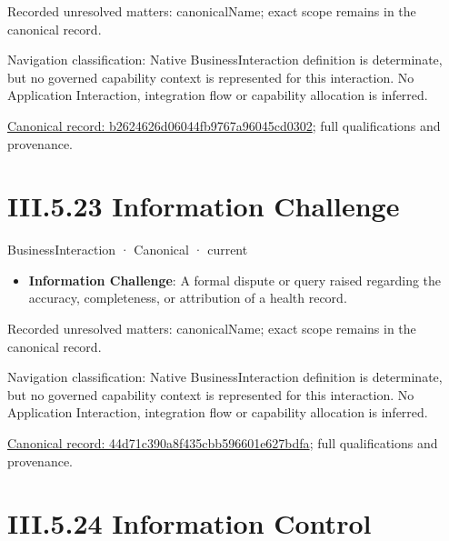 {\small Recorded unresolved matters: canonicalName; exact scope remains in the canonical record.}\par
{\small Navigation classification: Native BusinessInteraction definition is determinate, but no governed capability context is represented for this interaction. No Application Interaction, integration flow or capability allocation is inferred.}\par
{\footnotesize \href{../../../../../../../continuum/business/business-interaction/b2624626d06044fb9767a96045cd0302.md}{Canonical record: b2624626d06044fb9767a96045cd0302}; full qualifications and provenance.}\par
\section*{III.5.23 Information Challenge}
\label{navigation:III.5.23}

\label{element:44d71c390a8f435cbb596601e627bdfa}
{\small BusinessInteraction · Canonical · current}\par

\begin{itemize}


\item \textbf{Information Challenge}: A formal dispute or query raised regarding the accuracy, completeness, or attribution of a health record.

\end{itemize}

{\small Recorded unresolved matters: canonicalName; exact scope remains in the canonical record.}\par
{\small Navigation classification: Native BusinessInteraction definition is determinate, but no governed capability context is represented for this interaction. No Application Interaction, integration flow or capability allocation is inferred.}\par
{\footnotesize \href{../../../../../../../continuum/business/business-interaction/44d71c390a8f435cbb596601e627bdfa.md}{Canonical record: 44d71c390a8f435cbb596601e627bdfa}; full qualifications and provenance.}\par
\section*{III.5.24 Information Control}
\label{navigation:III.5.24}

